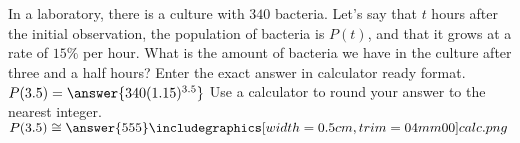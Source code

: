 \documentclass{ximera}
\author{Ivo Terek}
\begin{document}
\begin{exercise}

In a laboratory, there is a culture with $340$ bacteria. Let's say that $t$ hours after the initial observation, the population of bacteria is $P(t)$, and that it grows at a rate of $15\%$ per hour. What is the amount of bacteria we have in the culture after three and a half hours? 
Enter the exact answer in calculator ready format.  $P(3.5)=\answer{340(1.15)^{3.5}}$
Use a calculator to round your answer to the nearest integer. $P(3.5)\cong \answer{555} \calcHW$

\end{exercise}
\end{document}
